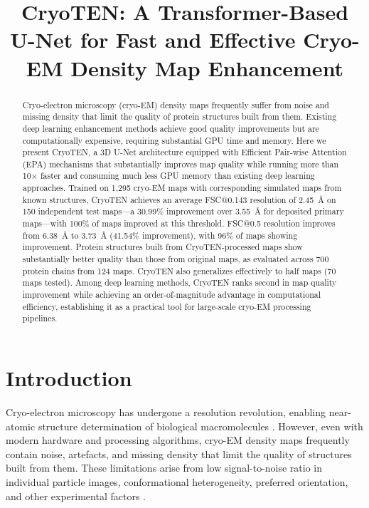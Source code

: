 \documentclass[11pt]{article}
\title{CryoTEN: A Transformer-Based U-Net for Fast and Effective Cryo-EM Density Map Enhancement}
\author{}
\date{}
\begin{document}
\maketitle

\begin{abstract}
Cryo-electron microscopy (cryo-EM) density maps frequently suffer from noise and missing density that limit the quality of protein structures built from them. Existing deep learning enhancement methods achieve good quality improvements but are computationally expensive, requiring substantial GPU time and memory. Here we present CryoTEN, a 3D U-Net architecture equipped with Efficient Pair-wise Attention (EPA) mechanisms that substantially improves map quality while running more than 10$\times$ faster and consuming much less GPU memory than existing deep learning approaches. Trained on 1,295 cryo-EM maps with corresponding simulated maps from known structures, CryoTEN achieves an average FSC@0.143 resolution of 2.45~\AA{} on 150 independent test maps---a 30.99\% improvement over 3.55~\AA{} for deposited primary maps---with 100\% of maps improved at this threshold. FSC@0.5 resolution improves from 6.38~\AA{} to 3.73~\AA{} (41.54\% improvement), with 96\% of maps showing improvement. Protein structures built from CryoTEN-processed maps show substantially better quality than those from original maps, as evaluated across 700 protein chains from 124 maps. CryoTEN also generalizes effectively to half maps (70 maps tested). Among deep learning methods, CryoTEN ranks second in map quality improvement while achieving an order-of-magnitude advantage in computational efficiency, establishing it as a practical tool for large-scale cryo-EM processing pipelines.
\end{abstract}

\section{Introduction}

Cryo-electron microscopy has undergone a resolution revolution, enabling near-atomic structure determination of biological macromolecules \citep{kuhlbrandt2014resolution,cheng2018single}. However, even with modern hardware and processing algorithms, cryo-EM density maps frequently contain noise, artefacts, and missing density that limit the quality of structures built from them. These limitations arise from low signal-to-noise ratio in individual particle images, conformational heterogeneity, preferred orientation, and other experimental factors \citep{lyumkis2019challenges}.
\end{document}
